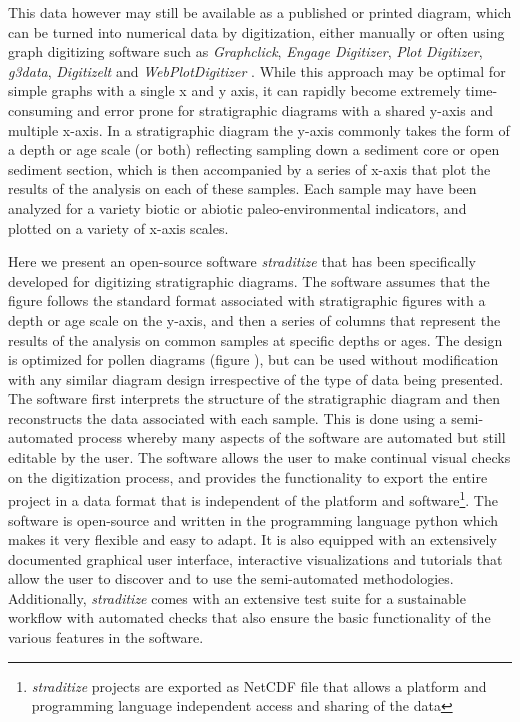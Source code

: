 \begin{refsection}
This data however may still be available as a published or printed diagram, which can be turned into numerical data by digitization, either manually or often using graph digitizing software such as \emph{Graphclick}, \emph{Engage Digitizer}, \emph{Plot Digitizer}, \emph{g3data}, \emph{Digitizelt} and \emph{WebPlotDigitizer} \citep{Rohatgi2019}. While this approach may be optimal for simple graphs with a single x and y axis, it can rapidly become extremely time-consuming and error prone for stratigraphic diagrams with a shared y-axis and multiple x-axis. In a stratigraphic diagram the y-axis commonly takes the form of a depth or age scale (or both) reflecting sampling down a sediment core or open sediment section, which is then accompanied by a series of x-axis that plot the results of the analysis on each of these samples. Each sample may have been analyzed for a variety biotic or abiotic paleo-environmental indicators, and plotted on a variety of x-axis scales. 

Here we present an open-source software \emph{straditize} \citep{SommerRechChevalierEtAl2019} that has been specifically developed for digitizing stratigraphic diagrams. The software assumes that the figure follows the standard format associated with stratigraphic figures with a depth or age scale on the y-axis, and then a series of columns that represent the results of the analysis on common samples at specific depths or ages. The design is optimized for pollen diagrams (figure \samplediagram), but can be used without modification with any similar diagram design irrespective of the type of data being presented. The software first interprets the structure of the stratigraphic diagram and then reconstructs the data associated with each sample. This is done using a semi-automated process whereby many aspects of the software are automated but still editable by the user. The software allows the user to make continual visual checks on the digitization process, and provides the functionality to export the entire project in a data format that is independent of the platform and software\footnote{\emph{straditize} projects are exported as NetCDF file \citep{RewDavisEmmersonEtAl1989} that allows a platform and programming language independent access and sharing of the data}. The software is open-source and written in the programming language python \citep{PerezGrangerHunter2011} which makes it very flexible and easy to adapt. It is also equipped with an extensively documented graphical user interface, interactive visualizations and tutorials that allow the user to discover and to use the semi-automated methodologies. Additionally, \emph{straditize} comes with an extensive test suite for a sustainable workflow with automated checks that also ensure the basic functionality of the various features in the software.


\end{refsection}
